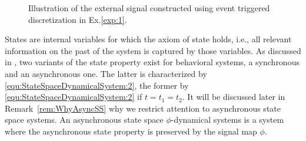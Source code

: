 \documentclass[letterpaper, 11 pt, onecolumn]{ieeeconf}
\newcommand{\0}{\ensuremath{\emptyset}}
\newcommand{\inps}{\ensuremath{\hspace{-0.8mm}\in\hspace{-0.8mm}}}
\newcommand{\Nbn}{\ensuremath{\mathbb{N}_{0}}}
\newcommand{\signalmap}{\phi}
\begin{document}
\begin{figure}[htb!]
\begin{center}
 \end{center}
   \vspace{-0.7cm}
 \caption{Illustration of the external signal constructed using event triggered discretization in Ex.\ref{exp:1}.}\label{fig:timescale2}
 \end{figure}


States are internal variables for which the axiom of state holds, i.e., all relevant information on the past of the system is captured by those variables. As discussed in \cite{SchmuckRaisch2014_ControlLetters}, two variants of the state property exist for behavioral systems, a synchronous and an asynchronous one. The latter is characterized by \eqref{equ:StateSpaceDynamicalSystem:2}, the former by \eqref{equ:StateSpaceDynamicalSystem:2} if ${t=t_1=t_2}$.
It will be discussed later in Remark~\ref{rem:WhyAsyncSS} why we restrict attention to asynchronous state space systems. An asynchronous state space $\signalmap$-dynamical systems is a system where the asynchronous state property is preserved by the signal map $\signalmap$.
\end{document}
